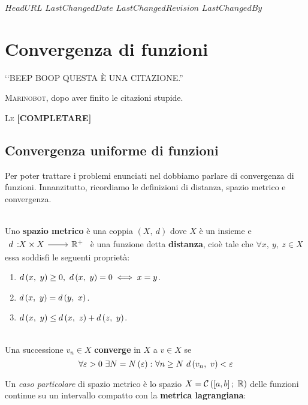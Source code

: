 \svnidlong
{$HeadURL$}
{$LastChangedDate$}
{$LastChangedRevision$}
{$LastChangedBy$}

\chapter{Convergenza di funzioni}

\begin{introduction}
	‘‘BEEP BOOP QUESTA È UNA CITAZIONE.''
	\begin{flushright}
		\textsc{Marinobot,} dopo aver finito le citazioni stupide.
	\end{flushright}
\end{introduction}
\lettrine[findent=1pt, nindent=0pt]{L}{e} \textbf{[COMPLETARE]} %
\section{Convergenza uniforme di funzioni}
Per poter trattare i problemi enunciati nel  dobbiamo parlare di convergenza di funzioni. Innanzitutto, ricordiamo le definizioni di distanza, spazio metrico e convergenza.
\begin{define}~{}\\
	Uno \textbf{spazio metrico} è una coppia $\left(X,\ d\right)$ dove $X$ è un insieme e $\funz{d}{X\times X}{\realset^+}$ è una funzione detta \textbf{distanza}, cioè tale che $\forall x,\ y,\ z\in X$ essa soddisfi le seguenti proprietà:
	\begin{enumerate}
		\item $\mvf{d}{x}{y}\geq 0,\ \mvf{d}{x}{y}=0\iff x=y$.
		\item $d\left(x,\ y\right)=d\left(y,\ x\right)$.
		\item $d\left(x,\ y\right)\leq d\left(x,\ z\right)+d\left(z,\ y\right)$.
	\end{enumerate}
\end{define}
\begin{define}[Convergenza.]~{}\\
	Una successione $v_n\in X$ \textbf{converge} in $X$ a $v\in X$ se
	\begin{equation}
		\forall \epsilon >0\ \exists N=N\left(\epsilon\right)\colon \forall n\geq N\ \mvf{d}{v_n}{v}<\epsilon
	\end{equation}
\end{define}
Un \textit{caso particolare} di spazio metrico è lo spazio $X=\mathcal{C}\left(\left[a,b\right];\ \realset\right)$ delle funzioni continue su un intervallo compatto con la \textbf{metrica lagrangiana}:
